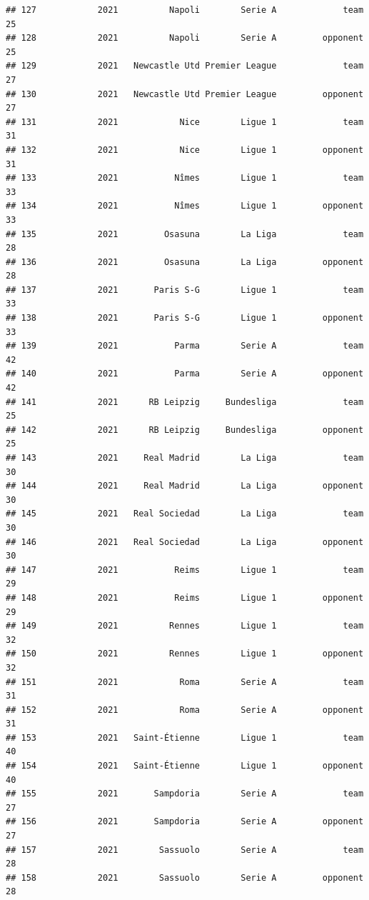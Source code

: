 \documentclass[
]{book}
\theoremstyle{definition}
\theoremstyle{definition}
\theoremstyle{definition}
\theoremstyle{definition}
\theoremstyle{remark}
\begin{document}
\begin{verbatim}
## 127            2021          Napoli        Serie A             team          25
## 128            2021          Napoli        Serie A         opponent          25
## 129            2021   Newcastle Utd Premier League             team          27
## 130            2021   Newcastle Utd Premier League         opponent          27
## 131            2021            Nice        Ligue 1             team          31
## 132            2021            Nice        Ligue 1         opponent          31
## 133            2021           Nîmes        Ligue 1             team          33
## 134            2021           Nîmes        Ligue 1         opponent          33
## 135            2021         Osasuna        La Liga             team          28
## 136            2021         Osasuna        La Liga         opponent          28
## 137            2021       Paris S-G        Ligue 1             team          33
## 138            2021       Paris S-G        Ligue 1         opponent          33
## 139            2021           Parma        Serie A             team          42
## 140            2021           Parma        Serie A         opponent          42
## 141            2021      RB Leipzig     Bundesliga             team          25
## 142            2021      RB Leipzig     Bundesliga         opponent          25
## 143            2021     Real Madrid        La Liga             team          30
## 144            2021     Real Madrid        La Liga         opponent          30
## 145            2021   Real Sociedad        La Liga             team          30
## 146            2021   Real Sociedad        La Liga         opponent          30
## 147            2021           Reims        Ligue 1             team          29
## 148            2021           Reims        Ligue 1         opponent          29
## 149            2021          Rennes        Ligue 1             team          32
## 150            2021          Rennes        Ligue 1         opponent          32
## 151            2021            Roma        Serie A             team          31
## 152            2021            Roma        Serie A         opponent          31
## 153            2021   Saint-Étienne        Ligue 1             team          40
## 154            2021   Saint-Étienne        Ligue 1         opponent          40
## 155            2021       Sampdoria        Serie A             team          27
## 156            2021       Sampdoria        Serie A         opponent          27
## 157            2021        Sassuolo        Serie A             team          28
## 158            2021        Sassuolo        Serie A         opponent          28

\end{verbatim}
\end{document}
